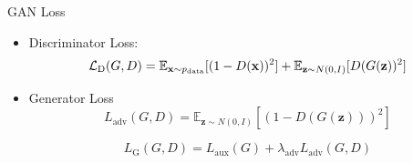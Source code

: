 \begin{frame}{GAN Loss}
    
    \begin{itemize}
        \item Discriminator Loss:
        $${\cal L}_{\mathrm{D}}(G,D)=\mathbb{E}_{\mathbf{x}\sim p_{\mathrm{data}}}[(1-D(\mathbf{x}))^{2}]+\mathbb{E}_{\mathbf{z}\sim N(0,I)}[D(G(\mathbf{z}))^{2}]$$
        
        \item Generator Loss
        $$L_{\mathrm{adv}}(G,D)=\mathbb{E}_{\mathbf{z}\sim N(0,I)}\left[(1-D(G(\mathbf{z})))^{2}\right]$$
        
        $$L_{\mathrm{G}}(G,D)=L_{\mathrm{aux}}(G)+\lambda_{\mathrm{adv}}L_{\mathrm{adv}}(G,D)$$
    \end{itemize}


\end{frame}

